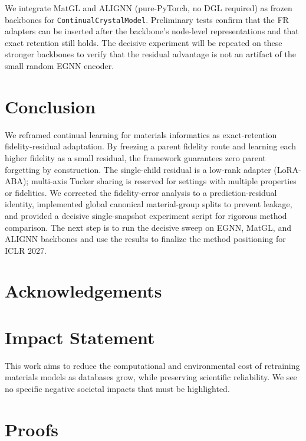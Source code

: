 \documentclass{article}
\theoremstyle{plain}
\theoremstyle{definition}
\theoremstyle{remark}
\begin{document}
We integrate MatGL and ALIGNN (pure-PyTorch, no DGL required) as frozen backbones for \texttt{ContinualCrystalModel}. Preliminary tests confirm that the FR adapters can be inserted after the backbone's node-level representations and that exact retention still holds. The decisive experiment will be repeated on these stronger backbones to verify that the residual advantage is not an artifact of the small random EGNN encoder.

\section{Conclusion}

We reframed continual learning for materials informatics as exact-retention fidelity-residual adaptation. By freezing a parent fidelity route and learning each higher fidelity as a small residual, the framework guarantees zero parent forgetting by construction. The single-child residual is a low-rank adapter (LoRA-ABA); multi-axis Tucker sharing is reserved for settings with multiple properties or fidelities. We corrected the fidelity-error analysis to a prediction-residual identity, implemented global canonical material-group splits to prevent leakage, and provided a decisive single-snapshot experiment script for rigorous method comparison. The next step is to run the decisive sweep on EGNN, MatGL, and ALIGNN backbones and use the results to finalize the method positioning for ICLR 2027.

\section*{Acknowledgements}

\section*{Impact Statement}

This work aims to reduce the computational and environmental cost of retraining materials models as databases grow, while preserving scientific reliability. We see no specific negative societal impacts that must be highlighted.




\newpage
\appendix
\onecolumn
\section{Proofs}
\label{sec:proofs}
\end{document}

